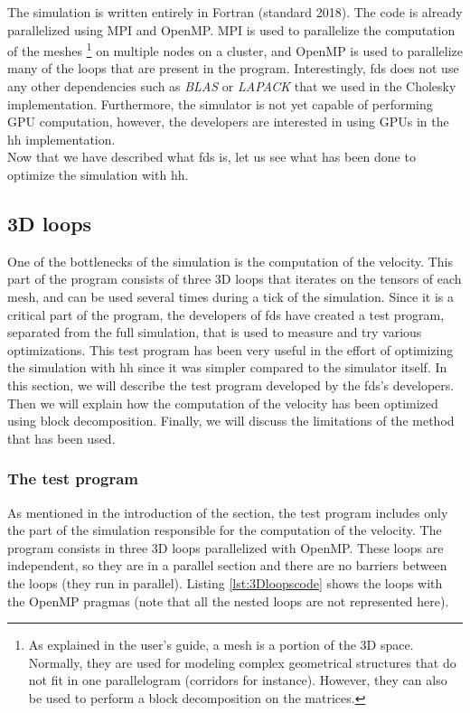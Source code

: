The simulation is written entirely in Fortran (standard 2018). The code is
already parallelized using MPI and OpenMP. MPI is used to parallelize the
computation of the meshes \footnote{As explained in the user's guide, a mesh is a
portion of the 3D space. Normally, they are used for modeling complex geometrical
structures that do not fit in one parallelogram (corridors for instance).
However, they can also be used to perform a block decomposition on the
matrices.} on multiple nodes on a cluster, and OpenMP is used to parallelize
many of the loops that are present in the program. Interestingly, \gls{fds} does
not use any other dependencies such as \textit{BLAS} or \textit{LAPACK} that
we used in the Cholesky implementation. Furthermore, the simulator is not yet
capable of performing GPU computation, however, the developers are interested in
using GPUs in the \gls{hh} implementation.\\

Now that we have described what \gls{fds} is, let us see what has been done to
optimize the simulation with \gls{hh}.

\subsection{3D loops}

One of the bottlenecks of the simulation is the computation of the velocity.
This part of the program consists of three 3D loops that iterates on the tensors
of each mesh, and can be used several times during a tick of the simulation.
Since it is a critical part of the program, the developers of \gls{fds} have
created a test program, separated from the full simulation, that is used to
measure and try various optimizations. This test program has been very useful in
the effort of optimizing the simulation with \gls{hh} since it was simpler
compared to the simulator itself. In this section, we will describe the test
program developed by the \gls{fds}'s developers. Then we will explain how the
computation of the velocity has been optimized using block decomposition.
Finally, we will discuss the limitations of the method that has been used.

\subsubsection{The test program}

As mentioned in the introduction of the section, the test program includes
only the part of the simulation responsible for the computation of the velocity.
The program consists in three 3D loops parallelized with OpenMP. These loops
are independent, so they are in a parallel section and there are no barriers
between the loops (they run in parallel). Listing \ref{lst:3Dloopscode}
shows the loops with the OpenMP pragmas (note that all the nested loops are not
represented here).

